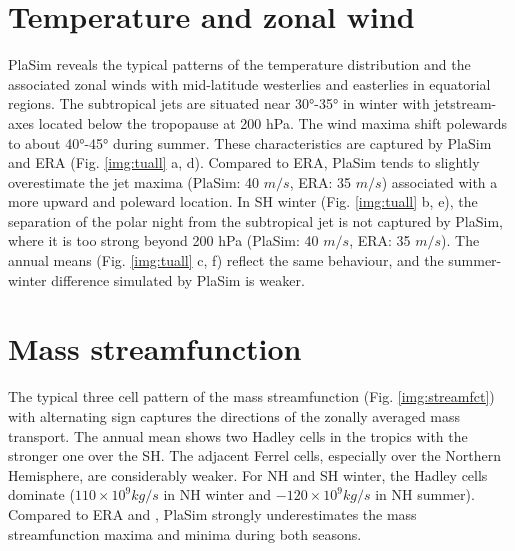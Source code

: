 \documentclass[12pt,a4paper,twoside,openright,headinclude,liststotoc,bibtotoc]{scrreprt}
\begin{document}
\vspace{-0.4cm}
\section{Temperature and zonal wind}
\vspace{-0.4cm}

PlaSim reveals the typical patterns of the temperature distribution and the associated zonal winds with mid-latitude westerlies and easterlies in equatorial regions. The subtropical jets are situated near 30°-35° in winter with jetstream-axes located below the tropopause at 200 hPa. The wind maxima shift polewards to about 40°-45° during summer. These characteristics are captured by PlaSim and ERA (Fig. \ref{img:tuall} a, d). Compared to ERA, PlaSim tends to slightly overestimate the jet maxima (PlaSim: 40 $m/s$, ERA: 35 $m/s$) associated with a more upward and poleward location. In SH winter (Fig. \ref{img:tuall} b, e), the separation of the polar night from the subtropical jet is not captured by PlaSim, where it is too strong beyond 200 hPa (PlaSim: 40 $m/s$, ERA: 35 $m/s$). The annual means (Fig. \ref{img:tuall} c, f) reflect the same behaviour, and the summer-winter difference simulated by PlaSim is weaker.


\vspace{-0.4cm}
\section{Mass streamfunction}
\vspace{-0.4cm}

The typical three cell pattern of the mass streamfunction (Fig. \ref{img:streamfct}) with alternating sign captures the directions of the zonally averaged mass transport. The annual mean shows two Hadley cells in the tropics with the stronger one over the SH. The adjacent Ferrel cells, especially over the Northern Hemisphere, are considerably weaker. For NH and SH winter, the Hadley cells dominate ($110\times 10^{9} kg/s$ in NH winter and $-120\times 10^{9} kg/s$ in NH summer). Compared to ERA and \citet[p. 159]{Peixoto1993}, PlaSim strongly underestimates the mass streamfunction maxima and minima during both seasons.
\end{document}
